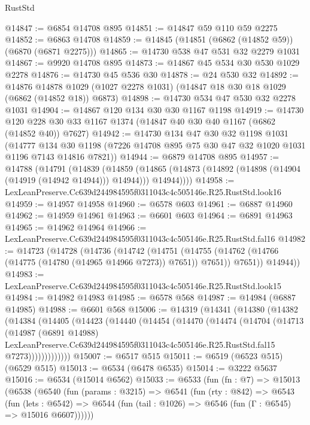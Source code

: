 \begin{lexlean}{RustStd}
\begin{coremodule}
@14847 := @6854 @14708 @895
@14851 := @14847 @59 @110 @59 @2275
@14852 := @6863 @14708
@14859 := @14845 (@14851 (@6862 (@14852 @59)) (@6870 (@6871 @2275)))
@14865 := @14730 @538 @47 @531 @32 @2279 @1031
@14867 := @9920 @14708 @895
@14873 := @14867 @45 @534 @30 @530 @1029 @2278
@14876 := @14730 @45 @536 @30
@14878 := @24 @530 @32
@14892 := @14876
    @14878
    @1029
    (@1027 @2278 @1031)
    (@14847 @18 @30 @18 @1029 (@6862 (@14852 @18)) @6873)
@14898 := @14730 @534 @47 @530 @32 @2278 @1031
@14904 := @14867 @120 @134 @30 @30 @1167 @1198
@14919 := @14730 @120 @228 @30 @33 @1167 @1374 (@14847 @40 @30 @40 @1167 (@6862 (@14852 @40)) @7627)
@14942 := @14730
    @134
    @47
    @30
    @32
    @1198
    @1031
    (@14777 @134 @30 @1198 (@7226 @14708 @895 @75 @30 @47 @32 @1020 @1031 @1196 @7143 @14816 @7821))
@14944 := @6879 @14708 @895
@14957 := @14788
    (@14791
      (@14839
        (@14859
          (@14865 (@14873 (@14892 (@14898 (@14904 (@14919 (@14942 @14944))) @14944))) @14944))))
@14958 := LexLeanPreserve.Cc639d244984595f0311043c4c505146e.R25.RustStd.look16
@14959 := @14957 @14958
@14960 := @6578 @603
@14961 := @6887 @14960
@14962 := @14959 @14961
@14963 := @6601 @603
@14964 := @6891 @14963
@14965 := @14962 @14964
@14966 := LexLeanPreserve.Cc639d244984595f0311043c4c505146e.R25.RustStd.fal16
@14982 := @14723
    (@14728
      (@14736
        (@14742
          (@14751
            (@14755 (@14762 (@14766 (@14775 (@14780 (@14965 @14966 @7273)) @7651)) @7651))
            @7651))
        @14944))
@14983 := LexLeanPreserve.Cc639d244984595f0311043c4c505146e.R25.RustStd.look15
@14984 := @14982 @14983
@14985 := @6578 @568
@14987 := @14984 (@6887 @14985)
@14988 := @6601 @568
@15006 := @14319
    (@14341
      (@14380
        (@14382
          (@14384
            (@14405
              (@14423
                (@14440
                  (@14454
                    (@14470
                      (@14474
                        (@14704
                          (@14713
                            (@14987
                              (@6891 @14988)
                              LexLeanPreserve.Cc639d244984595f0311043c4c505146e.R25.RustStd.fal15
                              @7273)))))))))))))
@15007 := @6517 @515
@15011 := @6519 (@6523 @515) (@6529 @515)
@15013 := @6534 (@6478 @6535)
@15014 := @3222 @5637
@15016 := @6534 (@15014 @6562)
@15033 := @6533
    (fun (fn : @7) =>
    @15013
      (@6538
        (@6540
          (fun (params : @3215) =>
          @6541
            (fun (rty : @842) =>
            @6543
              (fun (lets : @6542) =>
              @6544 (fun (tail : @1026) => @6546 (fun (Γ : @6545) => @15016 @6607))))))

\end{coremodule}
\end{lexlean}
